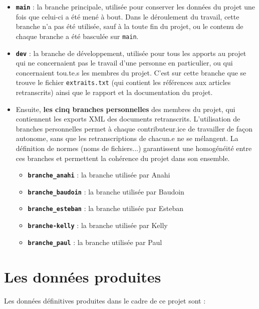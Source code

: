 \documentclass{article}
\begin{document}
	\begin{itemize}
		\item \textbf{\texttt{main}} : la branche principale, utilisée pour conserver les données du projet une fois que celui-ci a été mené à bout. Dans le déroulement du travail, cette branche n'a pas été utilisée, sauf à la toute fin du projet, ou le contenu de chaque branche a été basculée sur \texttt{main}.
		\item \textbf{\texttt{dev}} : la branche de développement, utilisée pour tous les apports au projet qui ne concernaient pas le travail d'une personne en particulier, ou qui concernaient tou.te.s les membres du projet. C'est sur cette branche que se trouve le fichier \texttt{extraits.txt} (qui contient les références aux articles retranscrits) ainsi que le rapport et la documentation du projet.
		\item Ensuite, \textbf{les cinq branches personnelles} des membres du projet, qui contiennent les exports XML des documents retranscrits. L'utilisation de branches personnelles permet à chaque contributeur.ice de travailler de façon autonome, sans que les retranscriptions de chacun.e ne se mélangent. La définition de normes (noms de fichiers...) garantissent une homogénéité entre ces branches et permettent la cohérence du projet dans son ensemble.
		\begin{itemize}
			\item \textbf{\texttt{branche\_anahi}} : la branche utilisée par Anahi
			\item \textbf{\texttt{branche\_baudoin}} : la branche utilisée par Baudoin
			\item \textbf{\texttt{branche\_esteban}} : la branche utilisée par Esteban
			\item \textbf{\texttt{branche-kelly}} : la branche utilisée par Kelly
			\item \textbf{\texttt{branche\_paul}} : la branche utilisée par Paul
		\end{itemize}
	\end{itemize}
	
	
	\section{Les données produites}
	Les données définitives produites dans le cadre de ce projet sont :
	
\end{document}
